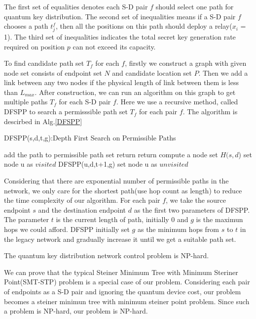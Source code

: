 The first set of equalities denotes each S-D pair $f$ should select one path for quantum key distribution. The second set of inequalities means if a S-D pair $f$ chooses a path $t_j^f$, then all the positions on this path should deploy a relay($x_i$ = 1). The third set of inequalities indicates the total secret key generation rate required on position $p$ can not exceed its capacity.

To find candidate path set $T_f$ for each $f$, firstly we construct a graph with given node set consists of endpoint set $N$ and candidate location set $P$. Then we add a link between any two nodes if the physical length of link between them is less than $L_{max}$. After construction, we can run an algorithm on this graph to get multiple paths $T_f$ for each S-D pair $f$. Here we use a recursive method, called DFSPP to search a permisssible path set $T_f$ for each pair $f$. The algorithm is descirbed in Alg.\ref{DFSPP}
\begin{algorithm}[h]\label{DFSPP}
	\caption{DFSPP(s,d,t,g):Depth First Search on Permissible Paths}
	\begin{algorithmic}[1]
		\STATE add the path to permissible path set
		\STATE return
		\ENDIF
		\STATE return
		\ENDIF
		\STATE  compute a node set $H(s,d$)
		\STATE set node u as $visited$
		\STATE DFSPP(u,d,t+1,g)
		\STATE set node u as $unvisited$
		\ENDFOR
	\end{algorithmic}
\end{algorithm}
Considering that there are exponential number of permissible paths in the network, we only care for the shortest path(use hop count as length) to reduce the time complexity of our algorithm. For each pair $f$, we take the source endpoint $s$ and  the destination endpoint $d$ as the first two parameters of DFSPP. The parameter $t$ is the current length of path, initially 0 and $g$ is the maximun hops we could afford. DFSPP initially set $g$ as the minimum hops from $s$ to $t$ in the legacy network and gradually increase it until we get a suitable path set.



\begin{theorem}
  The quantum key distribution network control problem is NP-hard.
\end{theorem}

We can prove that the typical Steiner Minimum Tree with Minimum Steriner Point(SMT-STP) problem is a special case of our problem. Considering each pair of endpoints as a S-D pair and ignoring the quantum device cost, our problem becomes a steiner minimun tree with minimum steiner point problem. Since such a problem is NP-hard, our problem is NP-hard.

